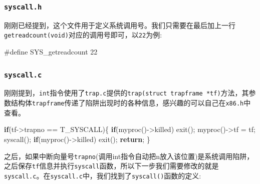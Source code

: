 \documentclass[
]{article}
\newenvironment{Shaded}{}{}
\newcommand{\ControlFlowTok}[1]{\textcolor[rgb]{0.00,0.44,0.13}{\textbf{#1}}}
\newcommand{\DecValTok}[1]{\textcolor[rgb]{0.25,0.63,0.44}{#1}}
\newcommand{\NormalTok}[1]{#1}
\newcommand{\OperatorTok}[1]{\textcolor[rgb]{0.40,0.40,0.40}{#1}}
\newcommand{\PreprocessorTok}[1]{\textcolor[rgb]{0.74,0.48,0.00}{#1}}
\begin{document}
\subsubsection{\texorpdfstring{\texttt{syscall.h}}{syscall.h}}\label{syscallh}

刚刚已经提到，这个文件用于定义系统调用号。我们只需要在最后加上一行\texttt{getreadcount(void)}对应的调用号即可，以\texttt{22}为例:

\begin{Shaded}
	\begin{Highlighting}[]
		\PreprocessorTok{\#define SYS\_getreadcount }\DecValTok{22}
	\end{Highlighting}
\end{Shaded}

\subsubsection{\texorpdfstring{\texttt{syscall.c}}{syscall.c}}\label{syscallc}

刚刚提到，\texttt{int}指令使用了\texttt{trap.c}提供的\texttt{trap(struct\ trapframe\ *tf)}方法，其参数结构体\texttt{trapframe}传递了陷阱出现时的各种信息，感兴趣的可以自己在\texttt{x86.h}中查看。

\begin{Shaded}
	\begin{Highlighting}[]
		\ControlFlowTok{if}\OperatorTok{(}\NormalTok{tf}\OperatorTok{{-}\textgreater{}}\NormalTok{trapno }\OperatorTok{==}\NormalTok{ T\_SYSCALL}\OperatorTok{)\{}
		\ControlFlowTok{if}\OperatorTok{(}\NormalTok{myproc}\OperatorTok{(){-}\textgreater{}}\NormalTok{killed}\OperatorTok{)}
		\NormalTok{    	exit}\OperatorTok{();}
		\NormalTok{  	myproc}\OperatorTok{(){-}\textgreater{}}\NormalTok{tf }\OperatorTok{=}\NormalTok{ tf}\OperatorTok{;}
		\NormalTok{  	syscall}\OperatorTok{();}
		\ControlFlowTok{if}\OperatorTok{(}\NormalTok{myproc}\OperatorTok{(){-}\textgreater{}}\NormalTok{killed}\OperatorTok{)}
		\NormalTok{    	exit}\OperatorTok{();}
		\ControlFlowTok{return}\OperatorTok{;}
		\OperatorTok{\}}
	\end{Highlighting}
\end{Shaded}

之后，如果中断向量号\texttt{trapno}(调用int指令自动把n放入该位置)是系统调用陷阱，之后保存\texttt{tf}信息并执行\texttt{syscall}函数，所以下一步我们需要修改的就是\texttt{syscall.c}。在\texttt{syscall.c}中，我们找到了\texttt{syscall()}函数的定义:
\end{document}
